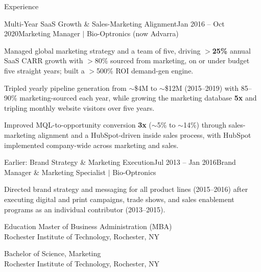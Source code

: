 \documentclass{resume}
\begin{document}
\begin{rSection}{Experience}
\begin{rSubsection}{Multi-Year SaaS Growth \& Sales-Marketing Alignment}{\textcolor{black!60}{Jan 2016 -- Oct 2020}}{Marketing Manager $\vert$ Bio-Optronics (now Advarra)}{}
\item Managed global marketing strategy and a team of five, driving $>$\textbf{25\%} annual SaaS CARR growth with $>$80\% sourced from marketing, on or under budget five straight years; built a $>$500\% ROI demand-gen engine.
\item Tripled yearly pipeline generation from $\sim$\$4M to $\sim$\$12M (2015--2019) with 85--90\% marketing-sourced each year, while growing the marketing database \textbf{5x} and tripling monthly website visitors over five years.
\item Improved MQL-to-opportunity conversion \textbf{3x} ($\sim$5\% to $\sim$14\%) through sales-marketing alignment and a HubSpot-driven inside sales process, with HubSpot implemented company-wide across marketing and sales.
\end{rSubsection}

\begin{rSubsection}{Earlier: Brand Strategy \& Marketing Execution}{\textcolor{black!60}{Jul 2013 -- Jan 2016}}{Brand Manager \& Marketing Specialist $\vert$ Bio-Optronics}{}
\item Directed brand strategy and messaging for all product lines (2015--2016) after executing digital and print campaigns, trade shows, and sales enablement programs as an individual contributor (2013--2015).
\end{rSubsection}

\end{rSection}
\vspace{-0.15cm}


\begin{rSection}{Education}
{Master of Business Administration (MBA)} \hfill {\textcolor{black!60}{}}\\
{Rochester Institute of Technology}, Rochester, NY

{Bachelor of Science, Marketing} \hfill {\textcolor{black!60}{}}\\
{Rochester Institute of Technology}, Rochester, NY
\end{rSection}
\end{document}
